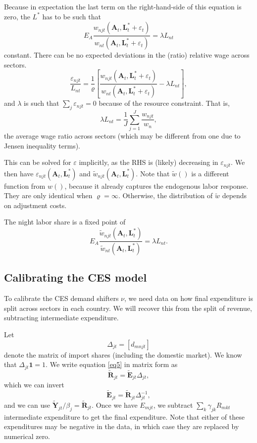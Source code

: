 \documentclass[12pt]{article}
\begin{document}
Because in expectation the last term on the right-hand-side of this equation is zero, the $L^*$ has to be such that
\[
E_{A}\frac 
	{w_{njt}(\mathbf A_{t}, \mathbf L_{t}^*+\varepsilon_t)}
	{w_{nt}(\mathbf A_{t}, \mathbf L_{t}^*+\varepsilon_t)}
= \lambda L_{nt}
\]
constant. There can be no expected deviations in the (ratio) relative wage across sectors. 
\begin{equation}\label{eq:varepsilon}
\frac {\varepsilon_{njt}} {L_{nt}}
=
\frac 1\varrho
\left[
\frac 
	{w_{njt}(\mathbf A_{t}, \mathbf L_{t}^*+\varepsilon_t)}
	{w_{nt}(\mathbf A_{t}, \mathbf L_{t}^*+\varepsilon_t)}
	-\lambda L_{nt}
\right],
\end{equation}
and $\lambda$ is such that $\sum_j\varepsilon_{njt}=0$ because of the resource constraint. That is, 
\[
\lambda L_{nt} = \frac1J \sum_{j=1}^{J} \frac{w_{njt}} {w_n},
\]
the average wage ratio across sectors (which may be different from one due to Jensen inequality terms).

This can be solved for $\varepsilon$ implicitly, as the RHS is (likely) decreasing in $\varepsilon_{njt}$. We then have $\varepsilon_{njt}(\mathbf A_t, \mathbf L_t^*)$ and $\tilde w_{njt}(\mathbf A_t, \mathbf L_t^*)$. Note that $\tilde w()$ is a different function from $w()$, because it already captures the endogenous labor response. They are only identical when $\varrho=\infty$. Otherwise, the distribution of $\tilde w$ depends on adjustment costs. 

The night labor share is a fixed point of
\[
E_{A}\frac 
	{\tilde w_{njt}(\mathbf A_{t}, \mathbf L_{t}^*)}
	{\tilde w_{nt}(\mathbf A_{t}, \mathbf L_{t}^*)}
= \lambda L_{nt}.
\]
\subsection{Calibrating the CES model}
To calibrate the CES demand shifters $\nu$, we need data on how final expenditure is split across sectors in each country. We will recover this from the split of revenue, subtracting intermediate expenditure.

Let
\[
\Delta_{jt} = [d_{mnjt}] 
\]
denote the matrix of import shares (including the domestic market). We know that $\Delta_{jt}\mathbf 1=1$. We write equation \eqref{eq5} in matrix form as
\begin{equation}
	\tilde {\mathbf R}_{jt} = \tilde {\mathbf E}_{jt}\Delta_{jt},
\end{equation}
which we can invert
\begin{equation}
	\tilde {\mathbf E}_{jt} = \tilde {\mathbf R}_{jt}\Delta_{jt}^{-1},
	\end{equation}
and we can use $\tilde {\mathbf Y}_{jt}/\beta_j = \tilde{\mathbf R}_{jt}$. Once we have $E_{mjt}$, we subtract $\sum_k\gamma_{jk}R_{mkt}$ intermediate expenditure to get the final expenditure. Note that either of these expenditures may be negative in the data, in which case they are replaced by numerical zero.
\end{document}
